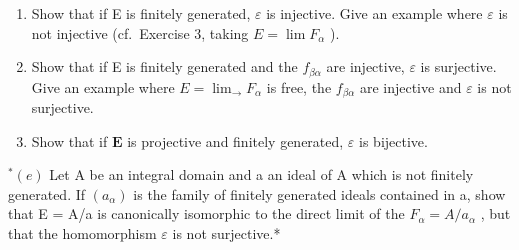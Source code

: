 \begin{enumerate}
\def\labelenumi{(\alph{enumi})}
\setcounter{enumi}{1}
\item
  Show that if E is finitely generated, \(\varepsilon\) is injective. Give an example where \(\varepsilon\) is not injective (cf.~Exercise 3, taking \(E = \lim F_{\alpha}\) ).
\item
  Show that if E is finitely generated and the \(f_{\beta\alpha}\) are injective, \(\varepsilon\) is surjective. Give an example where \(E = \lim_{\longrightarrow} F_{\alpha}\) is free, the \(f_{\beta\alpha}\) are injective and \(\varepsilon\) is not surjective.
\item
  Show that if \(\mathbf{E}\) is projective and finitely generated, \(\varepsilon\) is bijective.
\end{enumerate}

\(^{*}(e)\) Let A be an integral domain and a an ideal of A which is not finitely generated. If \((a_{\alpha})\) is the family of finitely generated ideals contained in a, show that E = A/a is canonically isomorphic to the direct limit of the \(F_{\alpha} = A/a_{\alpha}\) , but that the homomorphism \(\varepsilon\) is not surjective.*
